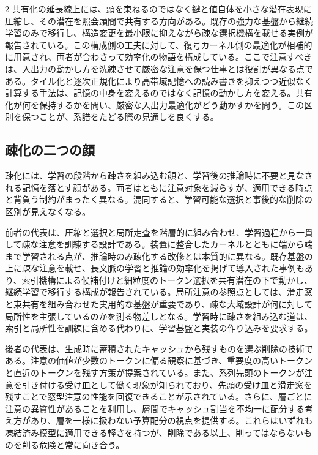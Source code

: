 \documentclass[lualatex,a4paper,10pt]{jlreq}
\begin{document}
\begin{multicols}{2}
共有化の延長線上には、頭を束ねるのではなく鍵と値自体を小さな潜在表現に圧縮し、その潜在を照会頭間で共有する方向がある。既存の強力な基盤から継続学習のみで移行し、構造変更を最小限に抑えながら疎な選択機構を載せる実例が報告されている\autocite{v32report}。この構成側の工夫に対して、復号カーネル側の最適化が相補的に用意され、両者が合わさって効率化の物語を構成している\autocite{flashmla}。ここで注意すべきは、入出力の動かし方を洗練させて厳密な注意を保つ仕事とは役割が異なる点である。タイル化と逐次正規化により高帯域記憶への読み書きを抑えつつ近似なく計算する手法は、記憶の中身を変えるのではなく記憶の動かし方を変える\autocite{flashattn}。共有化が何を保持するかを問い、厳密な入出力最適化がどう動かすかを問う。この区別を保つことが、系譜をたどる際の見通しを良くする。

\subsection{疎化の二つの顔}
疎化には、学習の段階から疎さを組み込む顔と、学習後の推論時に不要と見なされる記憶を落とす顔がある。両者はともに注意対象を減らすが、適用できる時点と背負う制約がまったく異なる。混同すると、学習可能な選択と事後的な削除の区別が見えなくなる。

前者の代表は、圧縮と選択と局所走査を階層的に組み合わせ、学習過程から一貫して疎な注意を訓練する設計である。装置に整合したカーネルとともに端から端まで学習される点が、推論時のみ疎化する改修とは本質的に異なる\autocite{nsa}。既存基盤の上に疎な注意を載せ、長文脈の学習と推論の効率化を掲げて導入された事例もあり、索引機構による候補付けと細粒度のトークン選択を共有潜在の下で動かし、継続学習で移行する構成が報告されている\autocite{dsaexp}\autocite{dsadebut}\autocite{v32report}。局所注意の参照点としては、滑走窓と束共有を組み合わせた実用的な基盤が重要であり、疎な大域設計が何に対して局所性を主張しているのかを測る物差しとなる\autocite{mistral7b}。学習時に疎さを組み込む道は、索引と局所性を訓練に含める代わりに、学習基盤と実装の作り込みを要求する。

後者の代表は、生成時に蓄積されたキャッシュから残すものを選ぶ削除の技術である。注意の価値が少数のトークンに偏る観察に基づき、重要度の高いトークンと直近のトークンを残す方策が提案されている\autocite{h2o}。また、系列先頭のトークンが注意を引き付ける受け皿として働く現象が知られており、先頭の受け皿と滑走窓を残すことで窓型注意の性能を回復できることが示されている\autocite{sinks}。さらに、層ごとに注意の異質性があることを利用し、層間でキャッシュ割当を不均一に配分する考え方があり、層を一様に扱わない予算配分の視点を提供する\autocite{pyramidkv}。これらはいずれも凍結済み模型に適用できる軽さを持つが、削除である以上、削ってはならないものを削る危険と常に向き合う。


\end{multicols}
\end{document}
